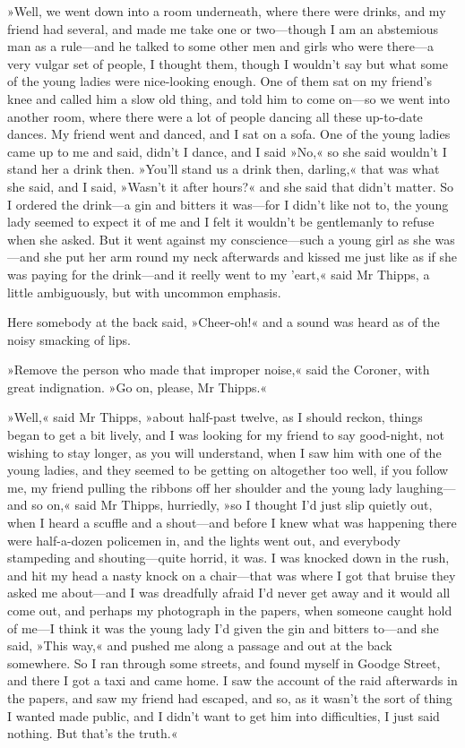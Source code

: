 »Well, we went down into a room underneath, where there were drinks, and my friend had several, and made me take one or two—though I am an abstemious man as a rule—and he talked to some other men and girls who were there—a very vulgar set of people, I thought them, though I wouldn't say but what some of the young ladies were nice-looking enough. One of them sat on my friend's knee and called him a slow old thing, and told him to come on—so we went into another room, where there were a lot of people dancing all these up-to-date dances. My friend went and danced, and I sat on a sofa. One of the young ladies came up to me and said, didn't I dance, and I said »No,« so she said wouldn't I stand her a drink then. »You'll stand us a drink then, darling,« that was what she said, and I said, »Wasn't it after hours?« and she said that didn't matter. So I ordered the drink—a gin and bitters it was—for I didn't like not to, the young lady seemed to expect it of me and I felt it wouldn't be gentlemanly to refuse when she asked. But it went against my conscience—such a young girl as she was—and she put her arm round my neck afterwards and kissed me just like as if she was paying for the drink—and it reelly went to my 'eart,« said Mr Thipps, a little ambiguously, but with uncommon emphasis.

Here somebody at the back said, »Cheer-oh!« and a sound was heard as of the noisy smacking of lips.

»Remove the person who made that improper noise,« said the Coroner, with great indignation. »Go on, please, Mr Thipps.«

»Well,« said Mr Thipps, »about half-past twelve, as I should reckon, things began to get a bit lively, and I was looking for my friend to say good-night, not wishing to stay longer, as you will understand, when I saw him with one of the young ladies, and they seemed to be getting on altogether too well, if you follow me, my friend pulling the ribbons off her shoulder and the young lady laughing—and so on,« said Mr Thipps, hurriedly, »so I thought I'd just slip quietly out, when I heard a scuffle and a shout—and before I knew what was happening there were half-a-dozen policemen in, and the lights went out, and everybody stampeding and shouting—quite horrid, it was. I was knocked down in the rush, and hit my head a nasty knock on a chair—that was where I got that bruise they asked me about—and I was dreadfully afraid I'd never get away and it would all come out, and perhaps my photograph in the papers, when someone caught hold of me—I think it was the young lady I'd given the gin and bitters to—and she said, »This way,« and pushed me along a passage and out at the back somewhere. So I ran through some streets, and found myself in Goodge Street, and there I got a taxi and came home. I saw the account of the raid afterwards in the papers, and saw my friend had escaped, and so, as it wasn't the sort of thing I wanted made public, and I didn't want to get him into difficulties, I just said nothing. But that's the truth.«

